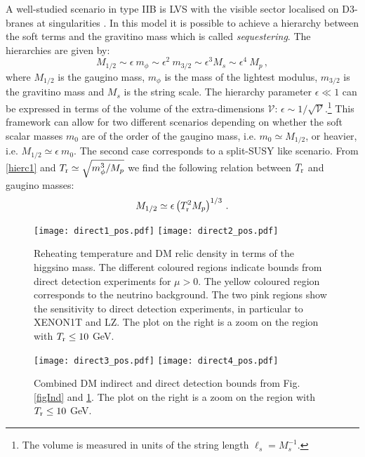 \documentclass[11pt,a4paper]{article}
\newcommand{\be}{\begin{equation}}
\newcommand{\ee}{\end{equation}}
\newcommand{\mc}{\mathcal}
\begin{document}
A well-studied scenario in type IIB is LVS with the visible sector localised on D3-branes at singularities \cite{Blumenhagen:2009gk,Aparicio:2015psl,Aparicio:2014wxa}. In this model it is possible to achieve a hierarchy between the soft terms and the gravitino mass which is called \textit{sequestering}. The hierarchies are given by:
\be
M_{1/2}\sim \epsilon\ m_\phi \sim \epsilon^2\ m_{3/2} \sim \epsilon^3 M_s \sim \epsilon^4\ M_p\,,
\label{hierc1}
\ee
where $M_{1/2}$ is the gaugino mass, $m_\phi$ is the mass of the lightest modulus, $m_{3/2}$ is the gravitino mass and $M_s$ is the string scale. The hierarchy parameter $\epsilon\ll 1$ can be expressed in terms of the volume of the extra-dimensions $\mc{V}$: $\epsilon\sim 1/\sqrt{\mc{V}}$.\footnote{The volume is measured in units of the string length $\ell_s = M_s^{-1}$.} This framework can allow for two different scenarios depending on whether the soft scalar masses $m_0$ are of the order of the gaugino mass, i.e. $m_0 \simeq M_{1/2}$, or heavier, i.e. $M_{1/2}\simeq \epsilon\ m_0$. The second case corresponds to a split-SUSY like scenario. From \eqref{hierc1} and $T_{\rm r}\simeq \sqrt{m_\phi^3/M_p}$ we find the following relation between $T_{\rm r}$ and gaugino masses:
\be
M_{1/2}\simeq \epsilon \left(T_{\rm r}^2 M_p\right)^{1/3}\,.
\label{DirectRel}
\ee


\begin{figure}[!t]
\centering
\hspace{-0.5cm}
\texttt{[image: direct1\_pos.pdf]}
\hspace{-0.1cm}
\texttt{[image: direct2\_pos.pdf]}
\hspace{-0.5cm}
\caption{Reheating temperature and DM relic density in terms of the higgsino mass. The different coloured regions indicate bounds from direct detection experiments for $\mu>0$. The yellow coloured region corresponds to the neutrino background. The two pink regions show the sensitivity to direct detection experiments, in particular to XENON1T and LZ. The plot on the right is a zoom on the region with $T_{\rm r}\leq 10$ GeV.}
\label{Fig2}
\end{figure}

\begin{figure}[!t]
\centering
\hspace{-0.5cm}
\texttt{[image: direct3\_pos.pdf]}
\hspace{-0.1cm}
\texttt{[image: direct4\_pos.pdf]}
\hspace{-0.5cm}
\caption{Combined DM indirect and direct detection bounds from Fig. \ref{figInd} and \ref{Fig2}. The plot on the right is a zoom on the region with $T_{\rm r}\leq10$ GeV.}
\label{Fig3}
\end{figure}
\end{document}
